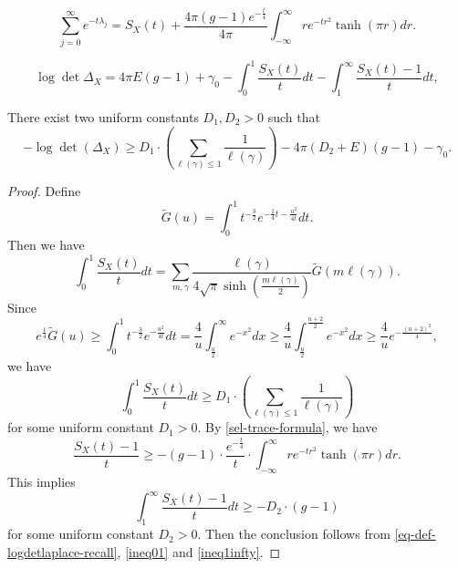 \documentclass[10pt,a4paper]{amsart}
\begin{document}
\begin{equation}\label{sel-trace-formula}
    \sum_{j=0}^\infty e^{-t\lambda_j}=S_X(t)+\frac{4\pi(g-1)e^{-\frac{t}{4}}}{4\pi}\int_{-\infty}^{\infty}re^{-tr^2}\tanh(\pi r)dr.
\end{equation}

\begin{equation}\label{eq-def-logdetlaplace-recall}
\log \det\Delta_X=4\pi E (g-1)+\gamma_0-\int_{0}^1\frac{S_X(t)}{t}dt-\int_1^\infty\frac{S_X(t)-1}{t}dt,
\end{equation}

\begin{lemma}\label{lowbound}
There exist two uniform constants $D_1, D_2>0$ such that 
$$
-\log \det (\Delta_X)\geq D_1\cdot \left( \sum\limits_{\ell(\gamma)\leq 1}\frac{1}{\ell(\gamma)}\right)-4\pi(D_2+E)(g-1)-\gamma_0.
$$    
\end{lemma}

\begin{proof}
Define  $$
 \tilde{G}(u)=\int_0^1t^{-\frac{3}{2}}e^{-\frac{1}{4}t-\frac{u^2}{4t}}dt.$$
Then we have $$
\int_0^1 \frac{S_X(t)}{t}dt=\sum\limits_{m,\gamma}\frac{\ell(\gamma)}{4\sqrt{\pi}\sinh(\frac{m\ell(\gamma)}{2})}\tilde{G}(m\ell(\gamma)).
$$
Since $$e^{\frac{1}{4}}\tilde{G}(u)\geq \int_0^1t^{-\frac{3}{2}}e^{-\frac{u^2}{4t}}dt=\frac{4}{u}\int_{\frac{u}{2}}^\infty e^{-x^2}dx\geq \frac{4}{u}\int_{\frac{u}{2}}^{\frac{u+2}{2}} e^{-x^2}dx
\geq \frac{4}{u}e^{-\frac{(u+2)^2}{4}},
$$
we have  \begin{equation}\label{ineq01}
    \int_0^1 \frac{S_X(t)}{t}dt\geq D_1\cdot \left( \sum\limits_{\ell(\gamma)\leq 1}\frac{1}{\ell(\gamma)}\right)
\end{equation}
for some uniform constant $D_1>0$.
By \eqref{sel-trace-formula}, we have 
\[ \frac{S_X(t)-1}{t}\geq -(g-1)\cdot \frac{e^{-\frac{t}{4}}}{t} \cdot \int_{-\infty}^{\infty}re^{-tr^2}\tanh(\pi r)dr.\]
This implies
\begin{equation}\label{ineq1infty}
    \int_1^\infty \frac{S_X(t)-1}{t}dt\geq - D_2 \cdot (g-1)
\end{equation} for some uniform  constant $D_2>0$.
    Then the conclusion follows from \eqref{eq-def-logdetlaplace-recall},  \eqref{ineq01} and \eqref{ineq1infty}.
\end{proof}
\end{document}
